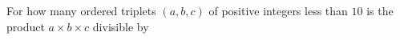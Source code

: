 For how many ordered triplets $(a,b,c)$ of positive integers less than $10$ is the product $a\times b\times c$ divisible by 
